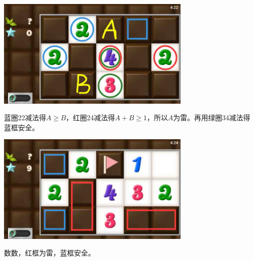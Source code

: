 \subsection{} %
\begin{center}
    \includegraphics[width=0.7\textwidth]{puzzlelow/95-1.jpg}
\end{center}
蓝圈22减法得$A\ge B$，红圈24减法得$A+B\ge 1$，所以$A$为雷。再用绿圈34减法得蓝框安全。
\begin{center}
    \includegraphics[width=0.7\textwidth]{puzzlelow/95-2.jpg}
\end{center}
数数，红框为雷，蓝框安全。

